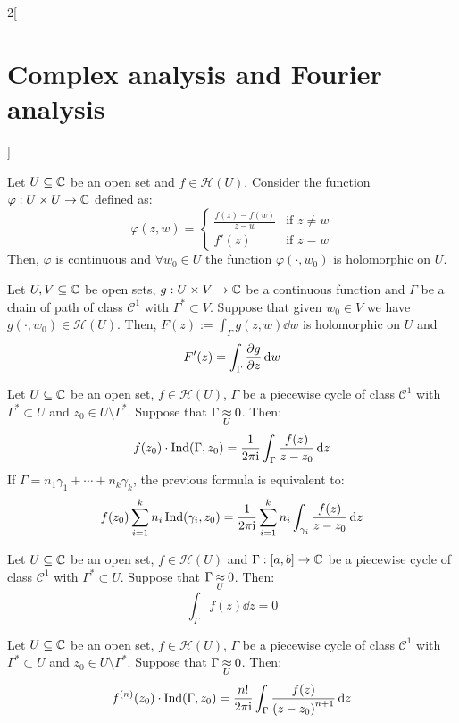 \documentclass[../../../main.tex]{subfiles}
\begin{document}
\begin{multicols}{2}[\section{Complex analysis and Fourier analysis}]
  \begin{lemma}
    Let $U\subseteq\mathbb{C}$ be an open set and $f\in\mathcal{H}(U)$. Consider the function $\varphi:U\times U\rightarrow\mathbb{C}$ defined as:
    $$
      \varphi(z,w)=
      \begin{cases}
        \frac{f(z)-f(w)}{z-w} & \text{if }z\ne w \\
        f'(z)                 & \text{if }z=w
      \end{cases}
    $$
    Then, $\varphi$ is continuous and $\forall w_0\in U$ the function $\varphi(\cdot,w_0)$ is holomorphic on $U$.
  \end{lemma}
  \begin{lemma}
    Let $U,V\subseteq\mathbb{C}$ be open sets, $g:U\times V\rightarrow\mathbb{C}$ be a continuous function and $\Gamma$ be a chain of path of class $\mathcal{C}^1$ with $\Gamma^*\subset V$. Suppose that given $w_0\in V$ we have $g(\cdot,w_0)\in\mathcal{H}(U)$. Then, $F(z):=\int_\Gamma g(z,w)\dd{w}$ is holomorphic on $U$ and $$F'(z)=\int_\Gamma\pdv{g}{z}(z,w)\dd{w}$$
  \end{lemma}
  \begin{theorem}
    Let $U\subseteq\mathbb{C}$ be an open set, $f\in\mathcal{H}(U)$, $\Gamma$ be a piecewise cycle of class $\mathcal{C}^1$ with $\Gamma^*\subset U$ and $z_0\in U\setminus\Gamma^*$. Suppose that $\Gamma\mathbin{\underset{U}{\approx}} 0$. Then:
    $$f(z_0)\cdot\operatorname{Ind}(\Gamma,z_0)=\frac{1}{2\pi\mathrm{i}}\int_\Gamma\frac{f(z)}{z-z_0}\dd{z}$$
    If $\Gamma=n_1\gamma_1+\cdots+n_k\gamma_k$, the previous formula is equivalent to:
    $$f(z_0)\sum_{i=1}^kn_i\operatorname{Ind}(\gamma_i,z_0)=\frac{1}{2\pi\mathrm{i}}\sum_{i=1}^kn_i\int_{\gamma_i}\frac{f(z)}{z-z_0}\dd{z}$$
  \end{theorem}
  \begin{theorem}
    Let $U\subseteq \mathbb{C}$ be an open set, $f\in\mathcal{H}(U)$ and $\Gamma:[a,b]\rightarrow\mathbb{C}$ be a piecewise cycle of class $\mathcal{C}^1$ with $\Gamma^*\subset U$. Suppose that $\Gamma\mathbin{\underset{U}{\approx}} 0$. Then: $$\int_\Gamma f(z)\dd{z}=0$$
  \end{theorem}
  \begin{corollary}
    Let $U\subseteq\mathbb{C}$ be an open set, $f\in\mathcal{H}(U)$, $\Gamma$ be a piecewise cycle of class $\mathcal{C}^1$ with $\Gamma^*\subset U$ and $z_0\in U\setminus\Gamma^*$. Suppose that $\Gamma\mathbin{\underset{U}{\approx}} 0$. Then:
    $$f^{(n)}(z_0)\cdot\operatorname{Ind}(\Gamma,z_0)=\frac{n!}{2\pi\mathrm{i}}\int_\Gamma\frac{f(z)}{{(z-z_0)}^{n+1}}\dd{z}$$
  \end{corollary}

\end{multicols}
\end{document}
